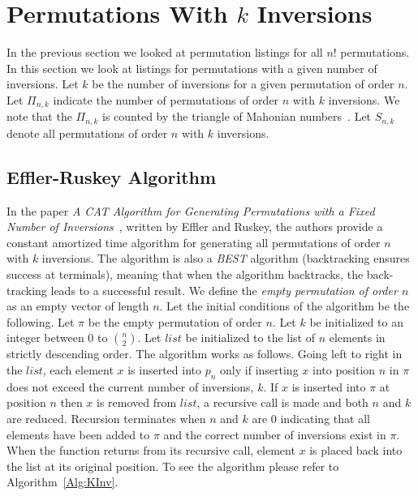 

\section{Permutations With $k$ Inversions}
In the previous section we looked at permutation listings for all $n!$ permutations. In this section we look at 
listings for permutations with a given number of inversions. Let $k$ be the number of inversions for a given permutation 
of order $n$. Let $\Pi_{n,k}$ indicate the number of permutations of order $n$ with $k$ inversions. We note that the $\Pi_{n,k}$ is counted by 
the triangle of Mahonian numbers~\cite{A40}. Let \emph{$S_{n,k}$} denote all permutations of order $n$ with $k$ inversions. 
\subsection{Effler-Ruskey Algorithm}
In the paper \emph{A CAT Algorithm for Generating Permutations with a Fixed Number of Inversions}~\cite{A26}, 
written by Effler and Ruskey, the authors provide a constant amortized time algorithm for 
generating all permutations of order $n$ with $k$ inversions. 
The algorithm is also a \emph{BEST} algorithm (backtracking ensures success at terminals), meaning that when the algorithm backtracks, 
the back-tracking leads to a successful result. We define the \emph{empty permutation of order $n$} as an empty 
vector of length $n$.
Let the initial conditions of the algorithm be the following. Let $\pi$ be the empty permutation of order $n$. 
Let $k$ be initialized to an integer between $0$ to ${n \choose 2}$. 
Let $list$ be initialized to the list of $n$ elements in strictly descending order. 
The algorithm works as follows.
Going left to right in the $list$, each element $x$ is inserted into $p_{n}$
only if inserting $x$ into position $n$ in $\pi$ does not exceed the current number of inversions, $k$.
If $x$ is inserted into $\pi$ at position $n$ then $x$ is removed from $list$, a recursive call is made and both $n$ and $k$ are reduced. 
Recursion terminates when $n$ and $k$ are $0$ indicating that all elements have been added to $\pi$ and the correct number of inversions 
exist in $\pi$. When the function returns from its recursive call, element $x$ is placed back into the list 
at its original position. To see the algorithm please refer to Algorithm~\ref{Alg:KInv}.
